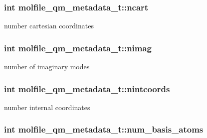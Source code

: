 \hypertarget{structmolfile__qm__metadata__t_a2e07911c0925c8203d13d776b29cf68d}{
\subsubsection[{ncart}]{\setlength{\rightskip}{0pt plus 5cm}int {\bf molfile\-\_\-qm\-\_\-metadata\-\_\-t\-::ncart}}}\label{structmolfile__qm__metadata__t_a2e07911c0925c8203d13d776b29cf68d}
number cartesian coordinates \hypertarget{structmolfile__qm__metadata__t_ad1d0e3955c761fcc52212d22f5e99f8d}{
\subsubsection[{nimag}]{\setlength{\rightskip}{0pt plus 5cm}int {\bf molfile\-\_\-qm\-\_\-metadata\-\_\-t\-::nimag}}}\label{structmolfile__qm__metadata__t_ad1d0e3955c761fcc52212d22f5e99f8d}
number of imaginary modes \hypertarget{structmolfile__qm__metadata__t_a78dac998b9cdce2dc5cfc52aa7ca724c}{
\subsubsection[{nintcoords}]{\setlength{\rightskip}{0pt plus 5cm}int {\bf molfile\-\_\-qm\-\_\-metadata\-\_\-t\-::nintcoords}}}\label{structmolfile__qm__metadata__t_a78dac998b9cdce2dc5cfc52aa7ca724c}
number internal coordinates \hypertarget{structmolfile__qm__metadata__t_a5affe7a323cb231bfe66395d238d0759}{
\subsubsection[{num\-\_\-basis\-\_\-atoms}]{\setlength{\rightskip}{0pt plus 5cm}int {\bf molfile\-\_\-qm\-\_\-metadata\-\_\-t\-::num\-\_\-basis\-\_\-atoms}}}\label{structmolfile__qm__metadata__t_a5affe7a323cb231bfe66395d238d0759}
